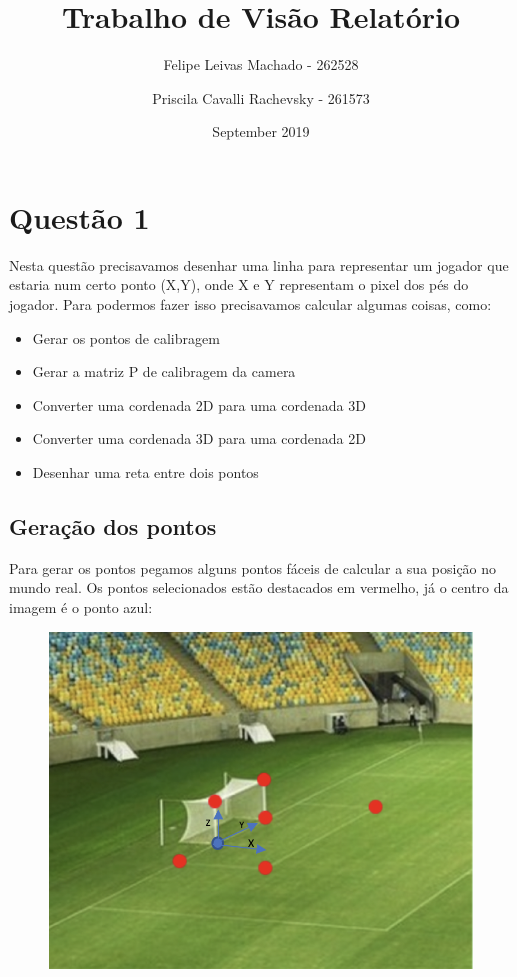 \documentclass{article}
\title{Trabalho de Visão Relatório}
\author{Felipe Leivas Machado - 262528 \and Priscila Cavalli Rachevsky - 261573 }
\date{September 2019}
\begin{document}
\maketitle

\section{Questão 1}
    Nesta questão precisavamos desenhar uma linha para representar um jogador que estaria num certo ponto (X,Y), onde X e Y representam o pixel dos pés do jogador. Para podermos fazer isso precisavamos calcular algumas coisas, como:
   \begin{itemize}
       \item Gerar os pontos de calibragem
       \item Gerar a matriz P de calibragem da camera
       \item Converter uma cordenada 2D para uma cordenada 3D
       \item Converter uma cordenada 3D  para uma cordenada 2D
       \item Desenhar uma reta entre dois pontos
   \end{itemize}

    \subsection{Geração dos pontos}
        Para gerar os pontos pegamos alguns pontos fáceis de calcular a sua posição no mundo real. Os pontos selecionados estão destacados em vermelho, já o centro da imagem é o ponto azul:

        \begin{figure}[h!]
        \includegraphics[scale=0.4]{maracana1Pontos.png}
        \end{figure}
\end{document}
